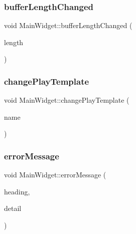 \hypertarget{class_main_widget_ac9c894776e1e971fe1c381b5e4b41296}{}\label{class_main_widget_ac9c894776e1e971fe1c381b5e4b41296} 
\subsubsection{\texorpdfstring{buffer\+Length\+Changed}{bufferLengthChanged}}
{\footnotesize\ttfamily void Main\+Widget\+::buffer\+Length\+Changed (\begin{DoxyParamCaption}\item[{qint64}]{length }\end{DoxyParamCaption})\hspace{0.3cm}{\ttfamily [slot]}}

\hypertarget{class_main_widget_aa52172d75102af3717d82ad3146065f1}{}\label{class_main_widget_aa52172d75102af3717d82ad3146065f1} 
\subsubsection{\texorpdfstring{change\+Play\+Template}{changePlayTemplate}}
{\footnotesize\ttfamily void Main\+Widget\+::change\+Play\+Template (\begin{DoxyParamCaption}\item[{Q\+String}]{name }\end{DoxyParamCaption})\hspace{0.3cm}{\ttfamily [slot]}}

\hypertarget{class_main_widget_a0172df70874e3df4a32a11f6f4779310}{}\label{class_main_widget_a0172df70874e3df4a32a11f6f4779310} 
\subsubsection{\texorpdfstring{error\+Message}{errorMessage}}
{\footnotesize\ttfamily void Main\+Widget\+::error\+Message (\begin{DoxyParamCaption}\item[{const Q\+String \&}]{heading,  }\item[{const Q\+String \&}]{detail }\end{DoxyParamCaption})\hspace{0.3cm}{\ttfamily [slot]}}

